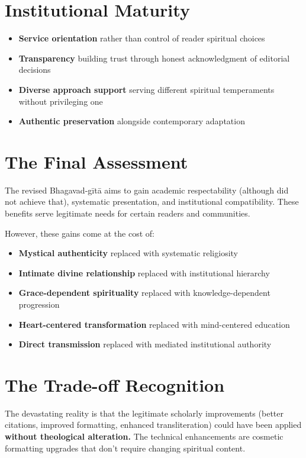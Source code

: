 \documentclass[11pt,twoside]{book}
\begin{document}
\section*{Institutional Maturity}
\label{sec:orge3a1d0b}
\begin{itemize}
\item \textbf{\textbf{Service orientation}} rather than control of reader spiritual choices
\item \textbf{\textbf{Transparency}} building trust through honest acknowledgment of editorial decisions
\item \textbf{\textbf{Diverse approach support}} serving different spiritual temperaments without privileging one
\item \textbf{\textbf{Authentic preservation}} alongside contemporary adaptation
\end{itemize}
\section*{The Final Assessment}
\label{sec:org87e158a}

The revised Bhagavad-gītā aims to gain academic respectability (although did not achieve that), systematic presentation, and institutional compatibility. These benefits serve legitimate needs for certain readers and communities.

However, these gains come at the cost of:
\begin{itemize}
\item \textbf{\textbf{Mystical authenticity}} replaced with systematic religiosity
\item \textbf{\textbf{Intimate divine relationship}} replaced with institutional hierarchy
\item \textbf{\textbf{Grace-dependent spirituality}} replaced with knowledge-dependent progression
\item \textbf{\textbf{Heart-centered transformation}} replaced with mind-centered education
\item \textbf{\textbf{Direct transmission}} replaced with mediated institutional authority
\end{itemize}
\section*{The Trade-off Recognition}
\label{sec:org9573913}

The devastating reality is that the legitimate scholarly improvements (better citations, improved formatting, enhanced transliteration) could have been applied \textbf{\textbf{without theological alteration.}} The technical enhancements are cosmetic formatting upgrades that don't require changing spiritual content.
\end{document}
